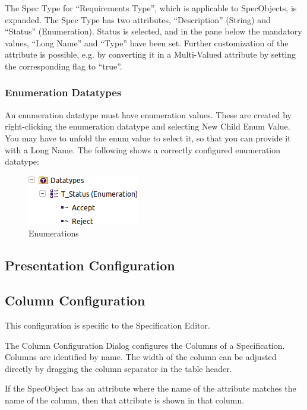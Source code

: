 The Spec Type for ``Requirements Type'', which is applicable to
SpecObjects, is expanded. The Spec Type has two attributes,
``Description'' (String) and ``Status'' (Enumeration). Status is
selected, and in the pane below the mandatory values, ``Long Name'' and
``Type'' have been set. Further customization of the attribute is
possible, e.g. by converting it in a Multi-Valued attribute by setting
the corresponding flag to ``true''.

\subsubsection{Enumeration Datatypes}

An enumeration datatype must have enumeration values. These are created
by right-clicking the enumeration datatype and selecting New Child
\textbar{} Enum Value. You may have to unfold the enum value to select
it, so that you can provide it with a Long Name. The following shows a
correctly configured enumeration datatype:

\begin{figure}[h!]
\centering      
\includegraphics[width=0.4\linewidth]{../rmf-images/rmf_enumeration.png}
\caption{Enumerations}      
\label{fig:Enumerations}
\end{figure}

\subsection{Presentation Configuration}

\subsection{Column Configuration}

This configuration is specific to the Specification Editor.

The Column Configuration Dialog configures the Columns of a
Specification. Columns are identified by name. The width of the column
can be adjusted directly by dragging the column separator in the table
header.

If the SpecObject has an attribute where the name of the attribute
matches the name of the column, then that attribute is shown in that
column.
